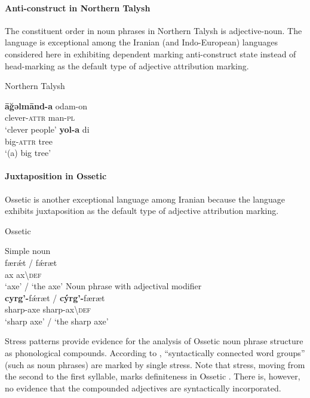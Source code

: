 \paragraph*{Anti\hyp{}construct in Northern Talysh} \label{talysh synchr}
The constituent order in noun phrases in Northern Talysh is adjective-noun. The language is exceptional among the Iranian (and Indo-European) languages considered here in exhibiting dependent marking anti\hyp{}construct state instead of head-marking  as the default type of adjective attribution marking.
\begin{exe}
\ex \rm{Northern Talysh \citep[27]{schulze2000}}%
\begin{xlist}
\ex
\gll	\textbf{āğəlmānd-a} odam-on\\
	clever-\textsc{attr} man-\textsc{pl}\\
\glt	‘clever people’
\ex
\gll	\textbf{yol-a} di\\
	big-\textsc{attr} tree\\
\glt	‘(a) big tree’
\end{xlist}
\end{exe}

\paragraph*{Juxtaposition in Ossetic}
Ossetic is another exceptional language among Iranian because the language exhibits juxtaposition as the default type of adjective attribution marking.
\begin{exe}
\label{ossetic attrcomp}
\ex \rm{Ossetic \citep[12]{abaev1964}}
\begin{xlist}
\ex \rm{Simple noun}\\
\gll	færǽt / fǽræt\\
	ax { } ax\textbackslash\textsc{def}\\
\glt	‘axe’ / ‘the axe’
\ex \rm{Noun phrase with adjectival modifier}\\
\gll	\textbf{cyrg'-}fǽræt / \textbf{cýrg'-}færæt\\
	sharp-axe { } sharp-ax\textbackslash\textsc{def}\\
\glt	‘sharp axe’ / ‘the sharp axe’
\end{xlist}
\end{exe}
Stress patterns provide evidence for the analysis of Ossetic noun phrase structure as phonological compounds. According to \citet[10]{abaev1964}, “syntactically connected word groups” (such as noun phrases) are marked by single stress. Note that stress, moving from the second to the first syllable, marks definiteness in Ossetic \citep[12]{abaev1964}. There is, however, no evidence that the compounded adjectives are syntactically incorporated.

